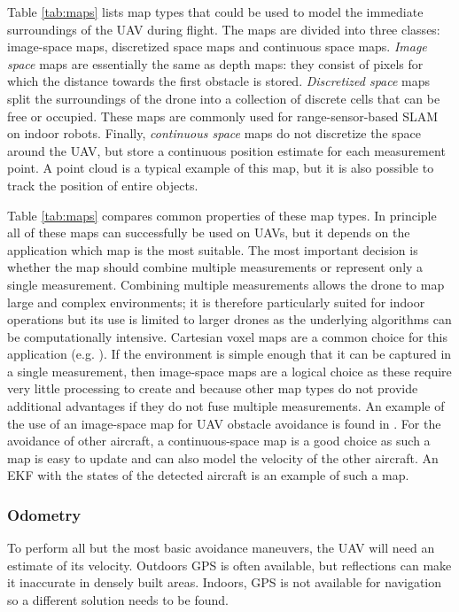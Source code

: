 Table \ref{tab:maps} lists map types that could be used to model the immediate surroundings of the \ac{UAV} during flight.
The maps are divided into three classes: image-space maps, discretized space maps and continuous space maps.
\emph{Image space} maps are essentially the same as depth maps: they consist of pixels for which the distance towards the first obstacle is stored.
\emph{Discretized space} maps split the surroundings of the drone into a collection of discrete cells that can be free or occupied.
These maps are commonly used for range-sensor-based \ac{SLAM} on indoor robots.
Finally, \emph{continuous space} maps do not discretize the space around the \ac{UAV}, but store a continuous position estimate for each measurement point.
A point cloud is a typical example of this map, but it is also possible to track the position of entire objects.

Table \ref{tab:maps} compares common properties of these map types.
In principle all of these maps can successfully be used on \acp{UAV}, but it depends on the application which map is the most suitable.
The most important decision is whether the map should combine multiple measurements or represent only a single measurement.
Combining multiple measurements allows the drone to map large and complex environments; it is therefore particularly suited for indoor operations but its use is limited to larger drones as the underlying algorithms can be computationally intensive.
Cartesian voxel maps are a common choice for this application (e.g. \cite{Schmid2014,Marzat2017}).
If the environment is simple enough that it can be captured in a single measurement, then image-space maps are a logical choice as these require very little processing to create and because other map types do not provide additional advantages if they do not fuse multiple measurements.
An example of the use of an image-space map for \ac{UAV} obstacle avoidance is found in \cite{Matthies2014}.
For the avoidance of other aircraft, a continuous-space map is a good choice as such a map is easy to update and can also model the velocity of the other aircraft.
An \ac{EKF} with the states of the detected aircraft is an example of such a map.






\subsubsection{Odometry}
\label{sec:odo}
To perform all but the most basic avoidance maneuvers, the \ac{UAV} will need an estimate of its velocity.
Outdoors \ac{GPS} is often available, but reflections can make it inaccurate in densely built areas.
Indoors, \ac{GPS} is not available for navigation so a different solution needs to be found.

